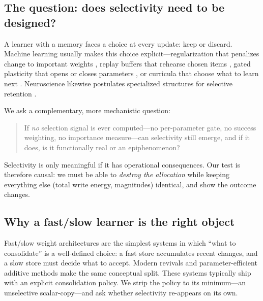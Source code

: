 \documentclass{article} %
\begin{document}
\subsection{The question: does selectivity need to be designed?}

A learner with a memory faces a choice at every update: keep or discard. Machine learning usually makes this choice explicit---regularization that penalizes change to important weights \citep{kirkpatrick2017overcoming, zenke2017continual}, replay buffers that rehearse chosen items \citep{robins1995catastrophic, delange2021continual}, gated plasticity that opens or closes parameters \citep{miconi2019differentiable, beaulieu2020learning}, or curricula that choose what to learn next \citep{poirier2005effect, bell2022effect, li2025optimal}. Neuroscience likewise postulates specialized structures for selective retention \citep{mcclelland1995why, kumaran2016what}.

We ask a complementary, more mechanistic question:

\begin{quote}
If \emph{no} selection signal is ever computed---no per-parameter gate, no success weighting, no importance measure---can selectivity still emerge, and if it does, is it functionally real or an epiphenomenon?
\end{quote}

Selectivity is only meaningful if it has operational consequences. Our test is therefore causal: we must be able to \emph{destroy the allocation} while keeping everything else (total write energy, magnitudes) identical, and show the outcome changes.

\subsection{Why a fast/slow learner is the right object}

Fast/slow weight architectures \citep{hinton1987using, ba2016using} are the simplest systems in which ``what to consolidate'' is a well-defined choice: a fast store accumulates recent changes, and a slow store must decide what to accept. Modern revivals \citep{schlag2021linear, vonoswald2023transformers, behrouz2025titans} and parameter-efficient additive methods \citep{houlsby2019parameter, hu2022lora, he2022towards} make the same conceptual split. These systems typically ship with an explicit consolidation policy. We strip the policy to its minimum---an unselective scalar-copy---and ask whether selectivity re-appears on its own.
\end{document}
